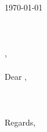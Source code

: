 \documentclass{article}
\begin{document}
    
    
    \header
    
    \bigskip\large
    
    \begin{singlespace}
        \today \\\\
        \ifthenelse{\NOT\equal{\recipientfirstname\recipientlastname\recipienttitle}{\empty}}{
            \recipientfirstname\ \recipientlastname \\
            \recipienttitle \\
        }{}
        \company \\
        \companyaddress \\
        \companycity, \companystate\ \companyzipcode \\\\
        Dear \recipientname, \\\\
         \\\\
        Regards, \\
        \name
    \end{singlespace}
\end{document}

